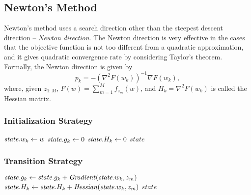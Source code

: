 \subsection{Newton's Method}
Newton's method uses a search direction other than the steepest descent direction -- \emph{Newton direction}.
The Newton direction is very effective in the cases that the objective function is not too different from a quadratic approximation, and it gives quadratic convergence rate by considering Taylor's theorem.
Formally, the Newton direction is given by
\[p_k = -(\nabla^2 F(w_k))^{-1} \nabla F(w_k),\]
where, given $z_{1:M}$, $F(w) = \sum_{m=1}^M f_{z_m}(w)$, and $H_k = \nabla^2 F(w_k)$ is called the Hessian matrix.

\subsubsection{Initialization Strategy}
\begin{algorithm} \label{alg:initialization-newton}
\begin{algorithmic}[1]
    \State $\mathit{state}.w_k \leftarrow w$
    \State $\mathit{state}.g_k \leftarrow 0$
    \State $\mathit{state}.H_k \leftarrow 0$
    \State \Return $\mathit{state}$
\end{algorithmic}
\end{algorithm}

\subsubsection{Transition Strategy}
\begin{algorithm} \label{alg:transition-newton}
\begin{algorithmic}[1]
    \State $\mathit{state}.g_k \leftarrow \mathit{state}.g_k + \mathit{Gradient}(\mathit{state}.w_k, z_m)$
    \State $\mathit{state}.H_k \leftarrow \mathit{state}.H_k + \mathit{Hessian}(\mathit{state}.w_k, z_m)$
    \State \Return $\mathit{state}$
\end{algorithmic}
\end{algorithm}

